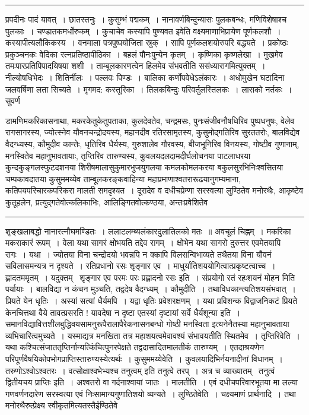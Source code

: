 \documentclass[11pt, openany]{book}
\begin{document}
\vspace{2mm}
\hrule

\noindent
{\s प्रपदीनः पादं यावत्~। छातस्तनुः~। कुसुम्भं पद्मकम्~। नानावर्णबिन्दुन्यासः पुलकबन्धः, मणिविशेषाश्च पुलकाः~। चण्डातकमर्धोरुकम्~। कुचाचेव कस्यापि पुण्यवत इवेति वक्ष्यमाणाभिप्रायेण पूर्णकलशौ~। कस्यापीत्यलौकिकस्य~। वनमाला पत्रपुष्पयोजिता स्रुक्~। सापि पूर्णकलशयोरुपरि बद्ध्यते~। प्रकोष्ठः प्रकुञ्चनकः वेदिका रत्नप्रतिष्ठापीठिका~। बहलं पौनःपुन्येन कृतम्~। कृष्णिका कृष्णलेखा~। मुखमेव तमःपारप्रतिपिपादयिषया शशी~। ताम्बूलकारणत्वेन हिलमेव संभवतीति ससंध्यारागमित्युक्तम्~। नील्योषधिभेदः~। शितिर्नीलः~। पल्लवः पिण्डः~। बालिका कर्णोपवेधेऽलंकारः~। अधोमुखेन घटादिना जलवर्षिणा लता सिच्यते~। मृगमद: कस्तूरिका~। तिलकबिन्दुः परिवर्तुलस्तिलकः~। लासको नर्तकः~। सुवर्ण\textendash}

\newpage

\noindent
डामणिमकरिकासनाथा, मकरकेतुकेतुपताका, कुलदेवतेव, चन्द्रमसः, पुनःसंजीवनौषधिरिव पुष्पधनुषः, वेलेव रागसागरस्य, ज्योत्स्नेव यौवनचन्द्रोदयस्य, महानदीव रतिरसामृतस्य, कुसुमोद्गतिरिव सुरततरोः, बालविद्येव वैदग्ध्यस्य, कौमुदीव कान्तेः, धृतिरिव धैर्यस्य, गुरुशालेव गौरवस्य, बीजभूनिरिव विनयस्य, गोष्टीव गुणानाम्, मनस्वितेव महानुभावतायाः, तृप्तिरिव तारुण्यस्य, कुवलयदलदामदीर्घलोचनया पाटलाधरया कुन्दकुङ्गलस्फुटदशनया शिरीषमालासुकुमारभुजयुगलया कमलकोमलकरया बकुलसुरभिनिःश्वसितया चम्पकावदातया कुसुममय्येव ताम्बूलकरङ्कवाहिन्या महाप्रमाणाश्वतरारूढयानुगम्यमाना, कतिपयपरिचारकपरिकरा मालती समदृश्यत~। दूरादेव व दधीचप्रेम्णा सरस्वत्या लुण्ठितेव मनोरथैः, आकृष्टेव कुतूहलेन, प्रत्युद्गतेवोत्कलिकाभिः, आलिङ्गितवोत्कण्ठया, अन्तःप्रवेशितेव

\vspace{2mm}
\hrule

\noindent
{\s शृङ्खलाबद्धो नानारत्नौघमण्डितः~। ललाटलम्ब्यलंकारदुलातिलको मतः~॥ अवचूलं चिह्नम्~। मकरिका मकराकारं रूपम्~। वेला यथा सागरं क्षोभयति तद्देव रागम्~। क्षोभेन यथा सागरो दुरुत्तर एवमेतयापि रागः~। यथा~। ज्योतया विना चन्द्रोदयो भवन्नपि न क्कापि विलसन्विभाव्यते तथैतया विना यौवनं सविलासमन्यत्र न दृश्यते~। रतिप्रधानो रसः शृङ्गार एव~। माधुर्यातिशययोगित्वात्प्रकृष्टत्वाच्च~। ह्लादतममृतम्~। यदुक्तम् \textendash\ {\qt शृङ्गार एव परमः परः प्रह्लादनो रसः} इति~। संप्रयोगो रतं रहःशयनं मोहन मिति पर्यायाः~। बालविद्या न कंचन मुञ्चति, तद्वदेष वैदग्ध्यम्~। {\qtt कौमुदीति}~। तथाविधकान्त्यतिशयसंभवात्~। प्रियते येन धृतिः~। अस्यां सत्यां धैर्यमपि~। यद्वा धृतिः प्रवेशरक्षणम्~। यथा प्रविशन्क विद्वाजनिकटं प्रियते केनचित्तथा वैये तावत्प्रसरति ! यावदेषा न दृष्टा एतस्यां दृष्टायां सर्वे धैर्यशून्या इति~। समानविद्यावित्तशीलबुद्धिवयसामनुरूपैरालापैरेकनासनबन्धो गोष्ठी मनस्विता इत्यनेनैतस्या महानुभावताया व्यभिचारित्वमुच्यते~। यस्माद्यत्र मनखिता तत्र महाशयत्वमेवावश्यं संभावयतीति स्थितमेव~। {\qtt तृप्तिरिवेति}~। यथा कश्चित्संजाततृप्तिर्नान्यत्किंचित्पुनरपेक्षते तद्वदासादितमालतीकं तारुण्यम्~। एतदाश्रयणेन परिपूर्णवैषयिकोपभोगप्राप्तिस्तारुण्यस्येत्यर्थः~। {\qtt कुसुममय्येवेति}~। कुवलयादिभिर्नयनादीनां विधानम्~। तरुणोऽश्वोऽश्वतरः~। {\qt वत्सोक्षाश्वभेभ्यश्च तनुत्वम्} इति तनुत्वे तरप्~। अत्र च व्याख्यातम् \textendash\ {\qt तनुत्वं द्वितीयचय प्राप्तिः} इति~। अश्वतरो वा गर्दनाश्वायां जातः~। {\qtt मालतीति}~। एवं दधीचपरिवारभूतया मा लल्या गणवर्णनदारेण सरस्वत्या एवं निःसामान्यगुणातिशयो व्यन्यते~। {\qtt लुण्ठितेवेति}~। चक्ष्यमाणं प्रार्थनादि~। तथा मनोरथैरुत्प्रेक्ष्य स्वीकृतमित्यतस्तैईण्ठितेवे\textendash}
\end{document}
